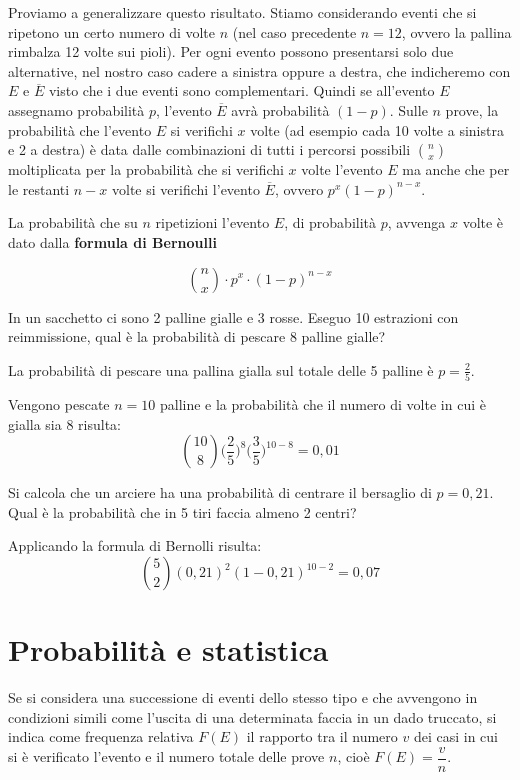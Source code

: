 Proviamo a generalizzare questo risultato. Stiamo considerando eventi che si 
ripetono un certo numero di volte $n$ (nel caso precedente $n=12$, ovvero la 
pallina rimbalza 12 volte sui pioli). Per ogni evento possono presentarsi 
solo due alternative, nel nostro caso cadere a sinistra oppure a destra, che 
indicheremo con $E$ e $\overline E$ visto che i due eventi sono complementari.
Quindi se all'evento $E$ assegnamo probabilità $p$, l'evento $\overline E$ 
avrà probabilità $(1-p)$.
Sulle $n$ prove, la probabilità che l'evento $E$ si verifichi $x$ volte (ad 
esempio cada 10 volte a sinistra e 2 a destra) è data dalle combinazioni di 
tutti i percorsi possibili $\binom{n}{x}$ moltiplicata per la probabilità che 
si verifichi $x$ volte l'evento $E$ ma anche che per le restanti $n-x$ volte 
si verifichi l'evento $\overline E$, ovvero $p^x(1-p)^{n-x}$.

\begin{definizione}
La probabilità che su $n$ ripetizioni l'evento $E$, di probabilità $p$, 
avvenga $x$ volte è dato dalla \textbf{formula di Bernoulli}

$$ \binom{n}{x}\cdot p^{x}\cdot(1-p)^{n-x}$$
\end{definizione}

\begin{esempio}
In un sacchetto ci sono 2 palline gialle e 3 rosse. Eseguo 10 estrazioni con 
reimmissione, qual è la probabilità di pescare 8 palline gialle?

La probabilità di pescare una pallina gialla sul totale delle 5 palline è 
$p=\frac{2}{5}$.

Vengono pescate $n=10$ palline e la probabilità che il numero di volte in cui 
è gialla sia 8 risulta:
$$ \binom{10}{8} \big(\frac{2}{5}\big)^{8}\big(\frac{3}{5}\big)^{10-8}=0,01$$

\end{esempio}

\begin{esempio}
Si calcola che un arciere ha una probabilità di centrare il bersaglio di 
$p=0,21$. Qual è la probabilità che in 5 tiri faccia almeno 2 centri?


Applicando la formula di Bernolli risulta:
$$ \binom{5}{2} (0,21)^{2}(1-0,21)^{10-2}=0,07$$

\end{esempio}

\section{Probabilità e statistica}
\label{sec:06_statistica}
Se si considera una successione di eventi dello stesso tipo e che avvengono 
in 
condizioni simili come l'uscita di una determinata faccia in un dado 
truccato, 
si indica come frequenza relativa $F(E)$ il rapporto tra il numero $v$ dei 
casi 
in cui si è verificato l'evento e il numero totale delle prove $n$, cioè 
$F(E)=\dfrac v n$.

